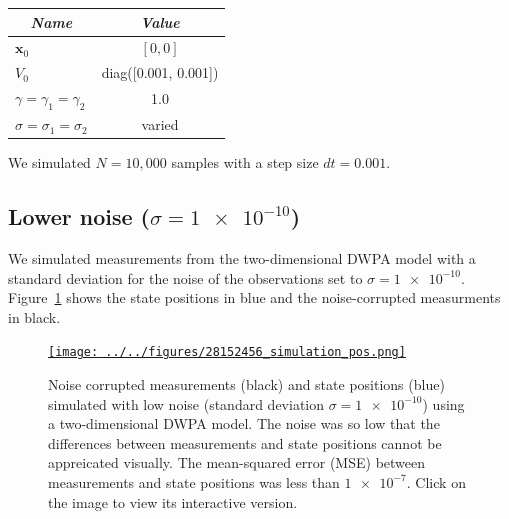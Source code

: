 \documentclass[12pt]{article}
\begin{document}
\begin{center}
    \begin{tabular}{|l|c|}\hline
        \multicolumn{1}{|c|}{\emph{Name}} & \multicolumn{1}{|c|}{\emph{Value}} \\\hline\hline
        $\mathbf{x}_0$                        & $[0, 0]$\\\hline
        $V_0$                                 & diag([0.001, 0.001])\\\hline
        $\gamma=\gamma_1=\gamma_2$            & 1.0\\\hline
        $\sigma=\sigma_1=\sigma_2$            & varied\\\hline
    \end{tabular}
\end{center}

\noindent We simulated $N=10,000$ samples with a step size $dt=0.001$.

\subsection{Lower noise ($\sigma=\num{1e-10}$)}

We simulated measurements from the two-dimensional DWPA model with a standard
deviation for the noise of the observations set to $\sigma=\num{1e-10}$.
Figure~\ref{fig:simulations_low_noise} shows the state positions in blue and
the noise-corrupted measurments in black.

\begin{figure}

    \centering
    \href{http://www.gatsby.ucl.ac.uk/~rapela/fwg/lds_repo/inference/figures/28152456_simulation_pos.html}{\texttt{[image: ../../figures/28152456\_simulation\_pos.png]}}

    \caption{Noise corrupted measurements (black) and state positions
    (blue) simulated with low noise (standard deviation $\sigma=\num{1e-10}$)
    using a two-dimensional DWPA model. The noise was so low that the
    differences between measurements and state positions cannot be appreicated
    visually.  The mean-squared error (MSE) between measurements and state
    positions was less than $\num{1e-7}$. Click on the image to view its
    interactive version.}

        \label{fig:simulations_low_noise}

\end{figure}
\end{document}
